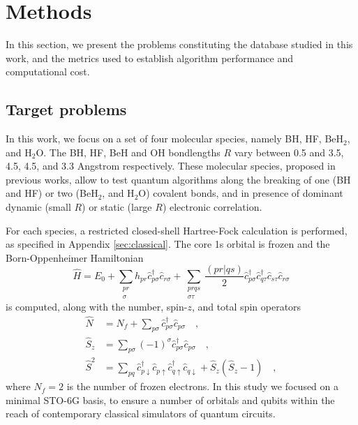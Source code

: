 \documentclass[aps,pra,twocolumn]{revtex4-2}
\newcommand{\crt}[1]{\hat{c}_{#1}^\dagger}
\newcommand{\dst}[1]{\hat{c}_{#1}^{\phantom{\dagger}}}
\begin{document}
\section{Methods}
\label{sec:methods}

In this section, we present the problems constituting the database studied in this work,
and the metrics used to establish algorithm performance and computational cost.

\subsection{Target problems}

In this work, we focus on a set of four molecular species, namely BH, HF, BeH$_2$, and H$_2$O.
The BH, HF, BeH and OH bondlengths $R$ vary between 0.5 and 3.5, 4.5, 4.5, and 3.3 Angstrom respectively.
These molecular species, proposed in previous works, allow to test quantum algorithms along the breaking of one (BH and HF) or two (BeH$_2$, and H$_2$O) covalent bonds,
and in presence of dominant dynamic (small $R$) or static (large $R$) electronic correlation.

For each species, a restricted closed-shell Hartree-Fock calculation is performed, as specified in Appendix \ref{sec:classical}.
The core 1s orbital is frozen and the Born-Oppenheimer Hamiltonian
\begin{equation}
\label{eq:hamiltonian}
\hat{H} = E_0 + \sum_{\substack{p r \\ \sigma}} h_{p r} \crt{p \sigma} \dst{r \sigma} + \sum_{\substack{p r q s \\ \sigma\tau}} \frac{(pr|qs)}{2} \crt{p \sigma} \crt{q \tau} \dst{s\tau}  \dst{r \sigma}
\end{equation}
is computed, along with the number, spin-$z$, and total spin operators
\begin{equation}
\label{eq:auxiliary}
\begin{split}
\hat{N} &= N_f + \sum_{p \sigma} \crt{p \sigma} \dst{p \sigma} \quad, \\
\hat{S}_z &= \sum_{p \sigma} (-1)^\sigma \crt{p \sigma} \dst{p \sigma} \quad, \\
\hat{S}^2 &= \sum_{pq} \crt{p\downarrow} \dst{p\uparrow} \crt{q\uparrow} \dst{q\downarrow}   + \hat{S}_z (\hat{S}_z-1) \quad,
\end{split}
\end{equation}
where $N_f = 2$ is the number of frozen electrons. 
In this study we focused on a minimal STO-6G basis, to ensure a number of orbitals and qubits within the reach of contemporary classical simulators of quantum circuits.
\end{document}
